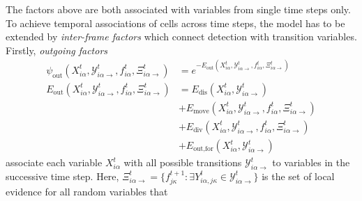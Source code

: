 \newsavebox{\interframetext}
\newlength{\correctLength}
\settowidth{\correctLength}{\usebox{\interframetext}}

\renewcommand{\arraystretch}{1}


The factors above are both associated with variables from single time steps only. To achieve temporal
associations of cells across time steps, the model has to be extended by \emph{inter-frame factors}
which connect detection with transition variables.
Firstly, \emph{outgoing factors} 
\begin{align}
    \label{eq:psi-out}
    \psi_{\mathrm{out}}(X_{i\alpha}^t, \mathcal{Y}_{i\alpha\rightarrow}^{t}, f_{i\alpha}^t,
    \Xi_{i\alpha\rightarrow}^{t}) &=
    e^{-E_{\mathrm{out}}(X_{i\alpha}^t, \mathcal{Y}_{i\alpha\rightarrow}^{t}, f_{i\alpha}^t, \Xi_{i\alpha\rightarrow}^{t})} \\
    E_{\mathrm{out}}(X_{i\alpha}^t, \mathcal{Y}_{i\alpha\rightarrow}^{t}, f_{i\alpha}^t,
    \Xi_{i\alpha\rightarrow}^{t}) &= E_{\text{dis}}(X_{i\alpha}^t,
    \mathcal{Y}_{i\alpha\rightarrow}^{t}) \\ \nonumber
    &+ E_{\text{move}}(X_{i\alpha}^t, \mathcal{Y}_{i\alpha\rightarrow}^{t}, f_{i\alpha}^t,
    \Xi_{i\alpha\rightarrow}^{t}) \\ \nonumber
    &+ E_{\text{div}}(X_{i\alpha}^t, \mathcal{Y}_{i\alpha\rightarrow}^{t}, f_{i\alpha}^t,
    \Xi_{i\alpha\rightarrow}^{t}) \\ \nonumber
    &+ E_{\text{out,for}}(X_{i\alpha}^t, \mathcal{Y}_{i\alpha\rightarrow}^{t})
\end{align}
associate each variable $X_{i\alpha}^t$ with all possible transitions
$\mathcal{Y}_{i\alpha\rightarrow}^{t}$ to variables in the successive time step. Here,
$\Xi_{i\alpha\rightarrow}^{t} = \{f_{j\kappa}^{t+1} : \exists Y_{i\alpha,j\kappa}^{t} \in
\mathcal{Y}_{i\alpha\rightarrow}^{t}\}$ is the set of local evidence for all random variables that
